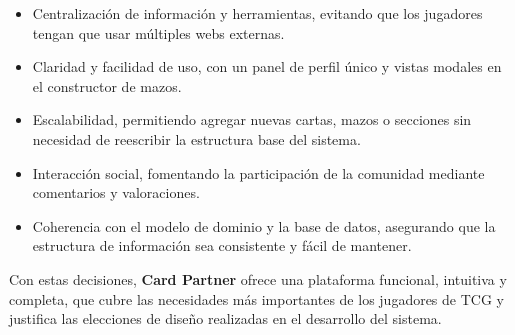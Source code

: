 \documentclass[10pt]{article}
\begin{document}
	\begin{itemize}
		\item Centralización de información y herramientas, evitando que los jugadores tengan que usar múltiples webs externas.
		\item Claridad y facilidad de uso, con un panel de perfil único y vistas modales en el constructor de mazos.
		\item Escalabilidad, permitiendo agregar nuevas cartas, mazos o secciones sin necesidad de reescribir la estructura base del sistema.
		\item Interacción social, fomentando la participación de la comunidad mediante comentarios y valoraciones.
		\item Coherencia con el modelo de dominio y la base de datos, asegurando que la estructura de información sea consistente y fácil de mantener.
	\end{itemize}
	
	Con estas decisiones, \textbf{Card Partner} ofrece una plataforma funcional, intuitiva y completa, que cubre las necesidades más importantes de los jugadores de TCG y justifica las elecciones de diseño realizadas en el desarrollo del sistema.
	
\end{document}
